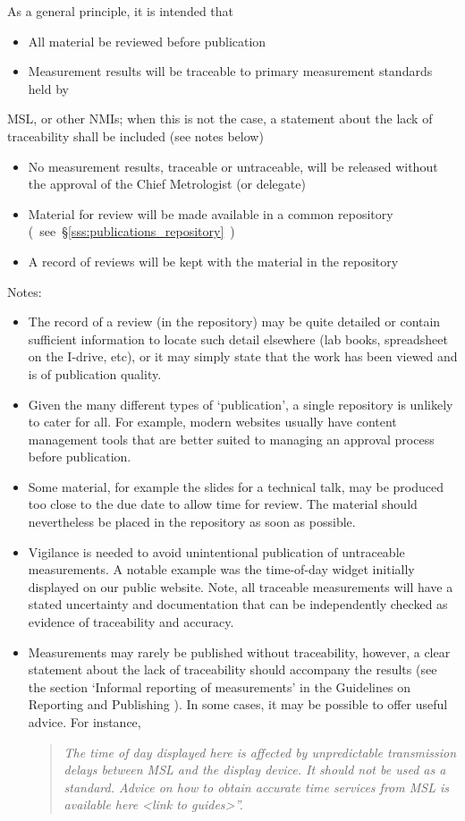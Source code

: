 As a general principle, it is intended that
\begin{itemize}
\item  All material be reviewed before publication
\item  Measurement results will be traceable to primary measurement standards held by 
\end{itemize}
MSL, or other NMIs; when this is not the case, a statement about the lack of traceability shall be included (see notes below)
\begin{itemize}
\item  No measurement results, traceable or untraceable, will be released without the approval of the Chief Metrologist (or delegate) 
\item  Material for review will be made available in a common repository (~see~\S\ref{sss:publications_repository}~)
\item  A record of reviews will be kept with the material in the repository 
\end{itemize}
Notes: 
\begin{itemize}
\item  The record of a review (in the repository) may be quite detailed or contain sufficient information to locate such detail elsewhere (lab books, spreadsheet on the I-drive, etc), or it may simply state that the work has been viewed and is of publication quality.  
\item  Given the many different types of ‘publication’, a single repository is unlikely to cater for all. For example, modern websites usually have content management tools that are better suited to managing an approval process before publication.  
\item  Some material, for example the slides for a technical talk, may be produced too close to the due date to allow time for review. The material should nevertheless be placed in the repository as soon as possible. 
\item  Vigilance is needed to avoid unintentional publication of untraceable measurements. A notable example was the time-of-day widget initially displayed on our public website. Note, all traceable measurements will have a stated uncertainty and documentation that can be independently checked as evidence of traceability and accuracy.
\item  Measurements may rarely be published without traceability, however, a clear statement about the lack of traceability should accompany the results (see the section ‘Informal reporting of measurements’ in the Guidelines on Reporting and Publishing \cite[\S\ref*{GRP-ss:informal_reporting}]{MSL_Reporting_Guidelines}). In some cases, it may be possible to offer useful advice. For instance, 
\begin{quote}\textit{
The time of day displayed here is affected by unpredictable transmission delays between MSL and the display device. It should not be used as a standard. Advice on how to obtain accurate time services from MSL is available here <link to guides>”.
}\end{quote} 
\end{itemize}

